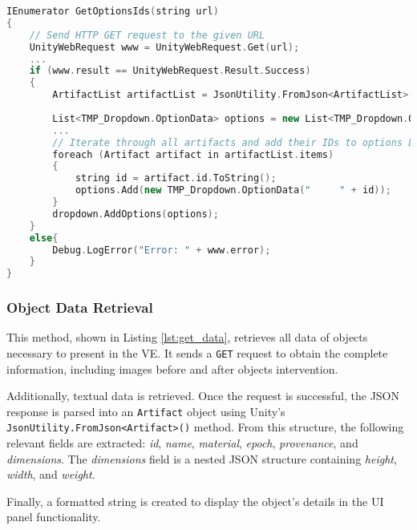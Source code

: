 \begin{lstlisting}[language=C++, caption={Method used to load artefact \glspl{ID} and define as options in the Dropdown.}, label={lst:artifact_ids},float] 
    IEnumerator GetOptionsIds(string url)
{
    // Send HTTP GET request to the given URL
    UnityWebRequest www = UnityWebRequest.Get(url);
    ...
    if (www.result == UnityWebRequest.Result.Success)
    {
        ArtifactList artifactList = JsonUtility.FromJson<ArtifactList>(wrappedJson);
        
        List<TMP_Dropdown.OptionData> options = new List<TMP_Dropdown.OptionData>();
        ...
        // Iterate through all artifacts and add their IDs to options List
        foreach (Artifact artifact in artifactList.items)
        {
            string id = artifact.id.ToString();
            options.Add(new TMP_Dropdown.OptionData("     " + id));
        }
        dropdown.AddOptions(options);
    }
    else{
        Debug.LogError("Error: " + www.error);
    }
}
\end{lstlisting}


\subsubsection{Object Data Retrieval}
\label{sec:data_retrieval}
This method, shown in Listing \ref{lst:get_data}, retrieves all data of objects necessary to present in the \gls{VE}.  
It sends a \texttt{GET} request to obtain the complete information, including images before and after objects intervention.  

Additionally, textual data is retrieved. Once the request is successful, the JSON response is parsed into an \texttt{Artifact} object using Unity's \texttt{JsonUtility.FromJson<Artifact>()} method.  
From this structure, the following relevant fields are extracted: \emph{id}, \emph{name}, \emph{material}, \emph{epoch}, \emph{provenance}, and \emph{dimensions}.  
The \emph{dimensions} field is a nested JSON structure containing \emph{height}, \emph{width}, and \emph{weight}.  

Finally, a formatted string is created to display the object's details in the \gls{UI} panel functionality.

